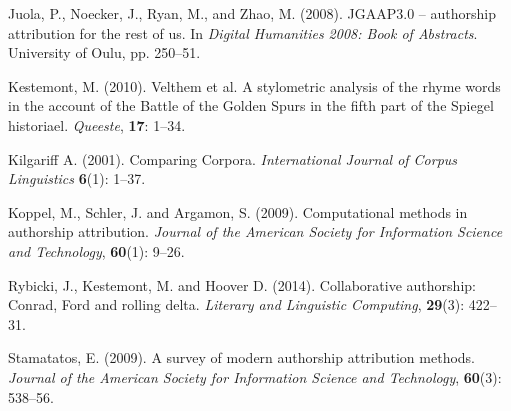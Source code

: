 \documentclass[11pt,a4paper]{article}
\begin{document}
Juola, P., Noecker, J., Ryan, M., and Zhao, M. (2008). JGAAP3.0 --
authorship attribution for the rest of us. In \textit{Digital Humanities
2008: Book of Abstracts}. University of Oulu, pp. 250--51.

Kestemont, M. (2010). Velthem et al. A stylometric analysis of the
rhyme words in the account of the Battle of the Golden Spurs in the
fifth part of the Spiegel historiael. \textit{Queeste}, \textbf{17}:
1--34.

Kilgariff A. (2001). Comparing Corpora. \textit{International Journal
of Corpus Linguistics} \textbf{6}(1): 1--37.

Koppel, M., Schler, J. and Argamon, S. (2009). Computational methods
in authorship attribution. \textit{Journal of the American Society
for Information Science and Technology}, \textbf{60}(1): 9--26.

Rybicki, J., Kestemont, M. and Hoover D. (2014). Collaborative authorship:
Conrad, Ford and rolling delta. \textit{Literary and Linguistic Computing},
\textbf{29}(3): 422--31.

Stamatatos, E. (2009). A survey of modern authorship attribution methods.
\textit{Journal of the American Society for Information Science and
Technology}, \textbf{60}(3): 538--56.
\end{document}
